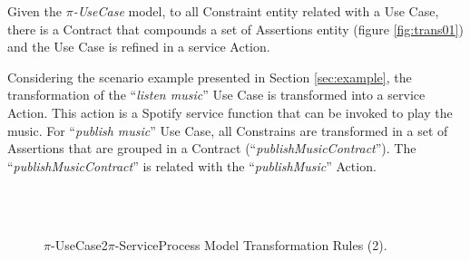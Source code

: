 Given the \textit{$\pi$-UseCase} model, to all {\sc Constraint} entity related
with a {\sc Use Case}, there is a {\sc Contract} that compounds a set of {\sc
Assertions} entity (figure \ref{fig:trans01}) and the {\sc Use Case} is refined
in a service {\sc Action}.  

\begin{exampl}
Considering the scenario example presented in Section
\ref{sec:example}, the transformation of the ``\textit{listen music}'' {\sc Use
Case} is transformed into a service {\sc Action}. This action is a Spotify
service function that can be invoked to play the music. For ``\textit{publish music}''
{\sc Use Case}, all {\sc Constrains} are transformed in a set of
{\sc Assertions} that are grouped in a {\sc Contract}
(``\textit{publishMusicContract}''). The
``\textit{publishMusicContract}'' is related with the ``\textit{publishMusic}''
{\sc Action}.
\end{exampl}

 
\begin{figure}[ht!]
\centering
{}
~ %
\\
~ %
\caption{$\pi$-UseCase2$\pi$-ServiceProcess Model Transformation Rules (2).}
\label{fig:modelRulesUS2SP2}
\end{figure}

